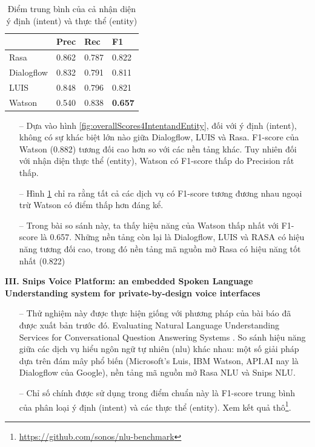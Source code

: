 \begin{table}[]
\begin{center}
\begin{tabular}{|l|l|l|l|}
\hline
\textbf{}  & Prec  & Rec   & F1             \\ \hline
Rasa       & 0.862 & 0.787 & 0.822          \\ \hline
Dialogflow & 0.832 & 0.791 & 0.811          \\ \hline
LUIS       & 0.848 & 0.796 & 0.821          \\ \hline
Watson     & 0.540 & 0.838 & \textbf{0.657} \\ \hline
\end{tabular}
    \caption{Điểm trung bình của cả nhận diện ý định (intent) và thực thể (entity)}
    \label{fig:combinedOverallScores}
    \end{center}
\end{table}

\begin{itemize}
    \item[--] Dựa vào hình \ref{fig:overallScores4IntentandEntity}, đối với ý định (intent), không có sự khác biệt lớn nào giữa Dialogflow, LUIS và Rasa. F1-score của Watson (0.882) tương đối cao hơn so với các nền tảng khác. Tuy nhiên đối với nhận diện thực thể (entity), Watson có F1-score thấp do Precision rất thấp.
    \item[--] Hình \ref{fig:combinedOverallScores} chỉ ra rằng tất cả các dịch vụ có F1-score tương đương nhau ngoại trừ Watson có điểm thấp hơn đáng kể.
    \item[--] Trong bài so sánh này, ta thấy hiệu năng của Watson thấp nhất với F1-score là 0.657. Những nền tảng còn lại là Dialogflow, LUIS và RASA có hiệu năng tương đối cao, trong đó nền tảng mã nguồn mở Rasa có hiệu năng tốt nhất (0.822)
\end{itemize}

\textbf{III. Snips Voice Platform: an embedded Spoken Language Understanding system for private-by-design voice interfaces}

\begin{itemize}
    \item[--] Thử nghiệm này được thực hiện giống với phương pháp của bài báo đã được xuất bản trước đó. Evaluating Natural Language Understanding Services for Conversational Question Answering Systems \cite{EvaluatingNLU}. So sánh hiệu năng giữa các dịch vụ hiểu ngôn ngữ tự nhiên (\ac{nlu}) khác nhau: một số giải pháp dựa trên đám mây phổ biến (Microsoft’s Luis, IBM Watson, API.AI nay là Dialogflow của Google), nền tảng mã nguồn mở Rasa NLU và Snips NLU.
    \item[--] Chỉ số chính được sử dụng trong điểm chuẩn này là F1-score trung bình của phân loại ý định (intent) và các thực thể (entity). Xem kết quả thô\footnote{\url{https://github.com/sonos/nlu-benchmark}}. 
\end{itemize}

